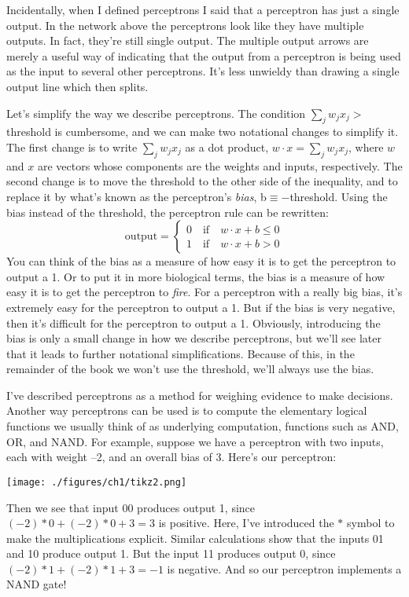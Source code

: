 \documentclass[a4paper,twoside,10pt]{book}
\begin{document}
Incidentally, when I defined perceptrons I said that a perceptron has just a single output. In the network above the perceptrons look like they have multiple outputs. In fact, they're still single output. The multiple output arrows are merely a useful way of indicating that the output from a perceptron is being used as the input to several other perceptrons. It's less unwieldy than drawing a single output line which then splits.

Let's simplify the way we describe perceptrons. The condition $\sum_j w_jx_j>$threshold is cumbersome, and we can make two notational changes to simplify it. The first change is to write $\sum_j w_jx_j$ as a dot product, $w\cdot x = \sum_j w_jx_j$, where $w$ and $x$ are vectors whose components are the weights and inputs, respectively. The second change is to move the threshold to the other side of the inequality, and to replace it by what's known as the perceptron's \textit{bias}, b$\equiv-$threshold. Using the bias instead of the threshold, the perceptron rule can be rewritten:
\begin{equation}
\textrm{output} = \begin{cases}
0 \quad \textrm{if}\quad w\cdot x + b  \le 0 \\
1 \quad \textrm{if}\quad w\cdot x + b  > 0 \tag{2}
\end{cases}
\end{equation}
You can think of the bias as a measure of how easy it is to get the perceptron to output a 1. Or to put it in more biological terms, the bias is a measure of how easy it is to get the perceptron to \textit{fire}. For a perceptron with a really big bias, it's extremely easy for the perceptron to output a 1. But if the bias is very negative, then it's difficult for the perceptron to output a 1. Obviously, introducing the bias is only a small change in how we describe perceptrons, but we'll see later that it leads to further notational simplifications. Because of this, in the remainder of the book we won't use the threshold, we'll always use the bias.

I've described perceptrons as a method for weighing evidence to make decisions. Another way perceptrons can be used is to compute the elementary logical functions we usually think of as underlying computation, functions such as AND, OR, and NAND. For example, suppose we have a perceptron with two inputs, each with weight --2, and an overall bias of 3. Here's our perceptron:
\begin{center}
	\texttt{[image: ./figures/ch1/tikz2.png]}
\end{center}
Then we see that input 00 produces output 1, since $(-2)\ast0+(-2)\ast0+3=3$ is positive. Here, I've introduced the $\ast$ symbol to make the multiplications explicit. Similar calculations show that the inputs 01 and 10 produce output 1. But the input 11 produces output 0, since $(-2)\ast1+(-2)\ast1+3=-1$ is negative. And so our perceptron implements a NAND gate!
\end{document}
